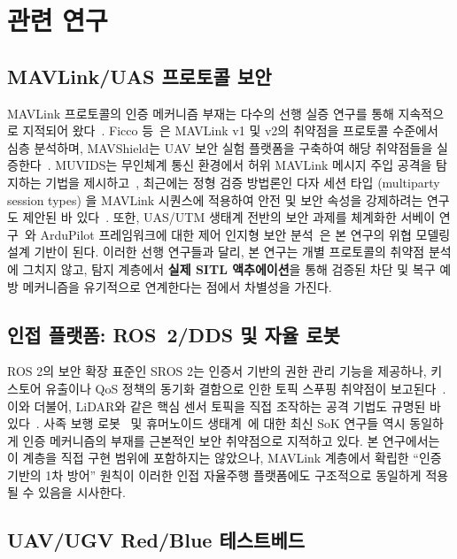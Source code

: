 \section{관련 연구}

\subsection{MAVLink/UAS 프로토콜 보안}

MAVLink 프로토콜의 인증 메커니즘 부재는 다수의 선행 실증 연구를 통해 지속적으로 지적되어 왔다~\cite{mavlink_survey_threats,mavlink_vuln_sciup,ficco2022mavlink,mavshield,mavlink_nutshell}. Ficco 등~\cite{ficco2022mavlink}은 MAVLink v1 및 v2의 취약점을 프로토콜 수준에서 심층 분석하며, MAVShield는 UAV 보안 실험 플랫폼을 구축하여 해당 취약점들을 실증한다~\cite{mavshield}. MUVIDS는 무인체계 통신 환경에서 허위 MAVLink 메시지 주입 공격을 탐지하는 기법을 제시하고~\cite{muvids}, 최근에는 정형 검증 방법론인 다자 세션 타입 (multiparty session types) 을 MAVLink 시퀀스에 적용하여 안전 및 보안 속성을 강제하려는 연구도 제안된 바 있다~\cite{session_types_mavlink}. 또한, UAS/UTM 생태계 전반의 보안 과제를 체계화한 서베이 연구~\cite{uas_survey_sok}와 ArduPilot 프레임워크에 대한 제어 인지형 보안 분석~\cite{ardupilot_reverse}은 본 연구의 위협 모델링 설계 기반이 된다. 이러한 선행 연구들과 달리, 본 연구는 개별 프로토콜의 취약점 분석에 그치지 않고, 탐지 계층에서 \textbf{실제 SITL 액추에이션}을 통해 검증된 차단 및 복구 예방 메커니즘을 유기적으로 연계한다는 점에서 차별성을 가진다.

\subsection{인접 플랫폼: ROS~2/DDS 및 자율 로봇}

ROS 2의 보안 확장 표준인 SROS 2는 인증서 기반의 권한 관리 기능을 제공하나, 키스토어 유출이나 QoS 정책의 동기화 결함으로 인한 토픽 스푸핑 취약점이 보고된다~\cite{sros2_insecurity,ros2_supply_chain,ros2_threat_model}. 이와 더불어, LiDAR와 같은 핵심 센서 토픽을 직접 조작하는 공격 기법도 규명된 바 있다~\cite{ros2_lidar_spoofing}. 사족 보행 로봇~\cite{quadruped_survey} 및 휴머노이드 생태계~\cite{humanoid_sok}에 대한 최신 SoK 연구들 역시 동일하게 인증 메커니즘의 부재를 근본적인 보안 취약점으로 지적하고 있다. 본 연구에서는 이 계층을 직접 구현 범위에 포함하지는 않았으나, MAVLink 계층에서 확립한 ``인증 기반의 1차 방어'' 원칙이 이러한 인접 자율주행 플랫폼에도 구조적으로 동일하게 적용될 수 있음을 시사한다.


\subsection{UAV/UGV Red/Blue 테스트베드}

